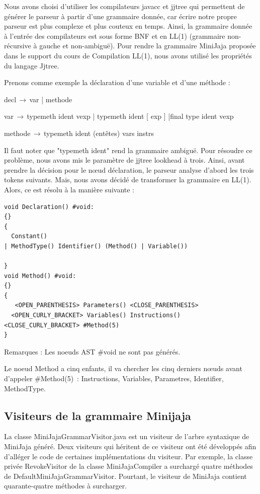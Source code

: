 \documentclass[a4paper,12pt]{report}
\begin{document}
Nous avons choisi d’utiliser les compilateurs javacc et jjtree qui permettent de générer le parseur à partir d'une grammaire donnée, car écrire notre propre parseur est plus complexe et plus couteux en temps. Ainsi, la grammaire donnée à l’entrée des compilateurs est sous forme BNF et en LL(1) (grammaire non-récursive à gauche et non-ambiguë). Pour rendre la grammaire MiniJaja proposée dans le support du cours de Compilation LL(1), nous avons utilisé les propriétés du langage Jjtree. 

Prenons comme exemple la déclaration d'une variable et d'une méthode :

decl$\,\to\,$var  |  methode

var$\,\to\,$typemeth ident vexp | typemeth ident [ exp ] |final type ident vexp

methode$\,\to\,$typemeth ident (entêtes) { vars instrs }

Il faut noter que "typemeth ident" rend la grammaire ambiguë. Pour résoudre ce problème,  nous avons mis le paramètre de jjtree lookhead à trois. Ainsi, avant prendre la décision pour le nœud déclaration, le parseur analyse d'abord les trois tokens suivants. Mais, nous avons décidé de transformer la grammaire en LL(1). Alors, ce est résolu à la manière suivante : 
 
\lstset{language=Java}
\begin{lstlisting}
void Declaration() #void: 
{}
{
  Constant()
| MethodType() Identifier() (Method() | Variable())

}
void Method() #void: 
{}
{
   <OPEN_PARENTHESIS> Parameters() <CLOSE_PARENTHESIS>
  <OPEN_CURLY_BRACKET> Variables() Instructions()  <CLOSE_CURLY_BRACKET> #Method(5)
}  
\end{lstlisting}

Remarques :
Les noeuds AST \#void ne sont pas générés.

Le noeud Method a cinq enfants, il va chercher les cinq derniers nœuds avant d'appeler \#Method(5)~: Instructions, Variables, Parametres, Identifier, MethodType.

\subsection{Visiteurs de la grammaire Minijaja }
La classe MiniJajaGrammarVisitor.java est un visiteur de l’arbre syntaxique de MiniJaja généré. Deux visiteurs qui héritent de ce visiteur ont été développés afin d'alléger le code de certaines implémentations du visiteur. Par exemple, la classe privée RevokeVisitor de la classe MiniJajaCompiler a surchargé quatre méthodes de DefaultMiniJajaGrammarVisitor. Pourtant, le visiteur de MiniJaja contient quarante-quatre méthodes à surcharger.     
\end{document}
